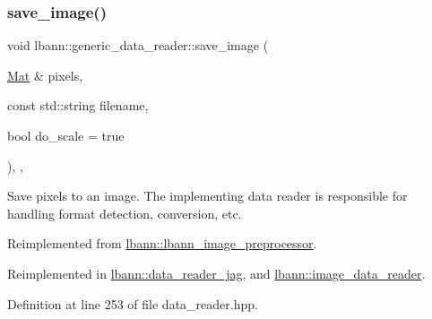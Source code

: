 \subsubsection{\texorpdfstring{save\+\_\+image()}{save\_image()}}
{\footnotesize\ttfamily void lbann\+::generic\+\_\+data\+\_\+reader\+::save\+\_\+image (\begin{DoxyParamCaption}\item[{\hyperlink{base_8hpp_a68f11fdc31b62516cb310831bbe54d73}{Mat} \&}]{pixels,  }\item[{const std\+::string}]{filename,  }\item[{bool}]{do\+\_\+scale = {\ttfamily true} }\end{DoxyParamCaption})\hspace{0.3cm}{\ttfamily [inline]}, {\ttfamily [override]}, {\ttfamily [virtual]}}

Save pixels to an image. The implementing data reader is responsible for handling format detection, conversion, etc. 

Reimplemented from \hyperlink{classlbann_1_1lbann__image__preprocessor_a67b11150501a829125e9c6999781bc67}{lbann\+::lbann\+\_\+image\+\_\+preprocessor}.



Reimplemented in \hyperlink{classlbann_1_1data__reader__jag_a396e7456d926ae9045011e7f28284946}{lbann\+::data\+\_\+reader\+\_\+jag}, and \hyperlink{classlbann_1_1image__data__reader_a71e4fa1eb8212cce88a2ed408ceeac51}{lbann\+::image\+\_\+data\+\_\+reader}.



Definition at line 253 of file data\+\_\+reader.\+hpp.


